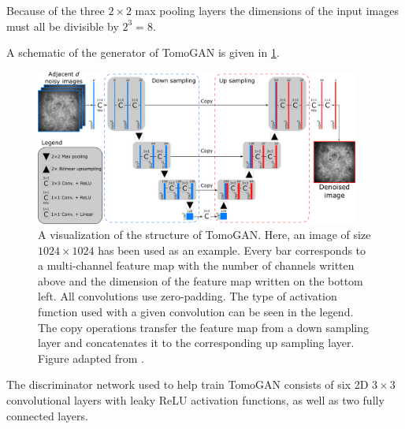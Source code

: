 Because of the three $2\times2$ max pooling layers the dimensions of the input images must all be divisible by $2^3=8$. 

A schematic of the generator of TomoGAN is given in \cref{fig:tomoganstructure}.

\begin{figure}[htbp]
    \centering
    \includegraphics[width=0.95\textwidth]{figures/tomoganstructure.png}
    \caption[Visualization of the structure of TomoGAN]{A visualization of the structure of TomoGAN. Here, an image of size $1024\times1024$ has been used as an example. Every bar corresponds to a multi-channel feature map with the number of channels written above and the dimension of the feature map written on the bottom left. All convolutions use zero-padding. The type of activation function used with a given convolution can be seen in the legend. The copy operations transfer the feature map from a down sampling layer and concatenates it to the corresponding up sampling layer. Figure adapted from \cite{liu2020tomogan}. } 
    \label{fig:tomoganstructure}
\end{figure}

The discriminator network used to help train TomoGAN consists of six 2D $3\times3$ convolutional layers with leaky ReLU activation functions, as well as two fully connected layers. 

